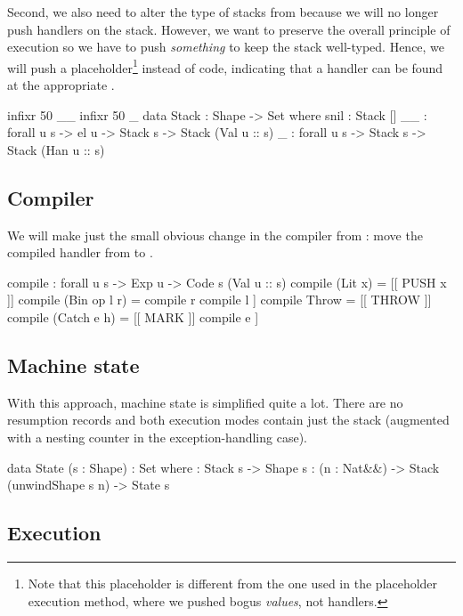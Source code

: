 Second, we also need to alter the type of stacks from 
because we will no longer push handlers on the stack. However, we want to
preserve the overall principle of execution so we have to push \emph{something}
to keep the stack well-typed.  Hence, we will push a placeholder\footnote{ Note
that this placeholder is different from the one used in the placeholder
execution method, where we pushed bogus \emph{values}, not handlers.} instead
of code, indicating that a handler can be found at the appropriate
.

\begin{code}
  infixr 50 _\scons\_
  infixr 50 \void\sconsh\_
  data Stack : Shape -> Set where
    snil : Stack []
    _\scons\_ : forall {u s} -> el u -> Stack s -> Stack (Val u :: s)
    \void\sconsh\_ : forall {u s} -> Stack s -> Stack (Han u :: s)
\end{code}

\subsection{Compiler}

We will make just the small obvious change in the compiler from
: move the compiled handler from  to .

\label{sec:hau-compile}\begin{code}
compile : forall {u s} -> Exp u -> Code s (Val u :: s)
compile (Lit x) = [[ PUSH x ]]
compile (Bin op l r) = compile r \app compile l \app [[ opInstr op ]] 
compile Throw = [[ THROW ]]
compile (Catch e h) = [[ MARK ]] \app compile e \app [[ UNMARK (compile h) ]]
\end{code}

\subsection{Machine state}

With this approach, machine state is simplified quite a lot. There are no
resumption records and both execution modes contain just the stack (augmented
with a nesting counter in the exception-handling case).

\begin{code}
  data State (s : Shape) : Set where
    \tick[_] : Stack s -> Shape s
    \x[_,_] : (n : Nat&\!&) -> Stack (unwindShape s n) -> State s
\end{code}

\subsection{Execution}

